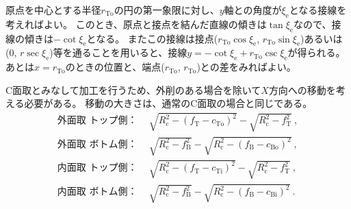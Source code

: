 \begin{hosoku}
原点を中心とする半径$r_\mathrm{To}$の円の第一象限に対し、$y$軸との角度が$\xi_\mathrm e$となる接線を考えればよい。
このとき、原点と接点を結んだ直線の傾きは$\tan\xi_\mathrm e$なので、接線の傾きは$-\cot\xi_\mathrm e$となる。
またこの接線は接点($r_\mathrm{To}\cos\xi_\mathrm e$, $r_\mathrm{To}\sin\xi_\mathrm e$)あるいは(0, $r\sec\xi_\mathrm e$)等を通ることを用いると、接線$y = -\cot\xi_\mathrm e+r_\mathrm{To}\csc\xi_\mathrm e$が得られる。
あとは$x = r_\mathrm{To}$のときの位置と、端点($r_\mathrm{To}$, $r_\mathrm{To}$)との差をみればよい。
\end{hosoku}



\clearpage
C面取とみなして加工を行うため、外削のある場合を除いて$X$方向への移動を考える必要がある。
移動の大きさは、通常のC面取の場合と同じである。
\begin{align*}
  \text{外面取 トップ側：}&~~
  \sqrt{R_\mathrm c^2-\left(f_\mathrm T-c_\mathrm{To}\right)^2}-\sqrt{R_\mathrm c^2-f_\mathrm T^2}\ ,\\
  \text{外面取 ボトム側：}&~~
  \sqrt{R_\mathrm c^2-f_\mathrm B^2}-\sqrt{R_\mathrm c^2-\left(f_\mathrm B-c_\mathrm{Bo}\right)^2}\ ,\\
  \text{内面取 トップ側：}&~~
  \sqrt{R_\mathrm c^2-\left(f_\mathrm T-c_\mathrm{Ti}\right)^2}-\sqrt{R_\mathrm c^2-f_\mathrm T^2}\ ,\\
  \text{内面取 ボトム側：}&~~
  \sqrt{R_\mathrm c^2-f_\mathrm B^2}-\sqrt{R_\mathrm c^2-\left(f_\mathrm B-c_\mathrm{Bi}\right)^2}\ .
\end{align*}



